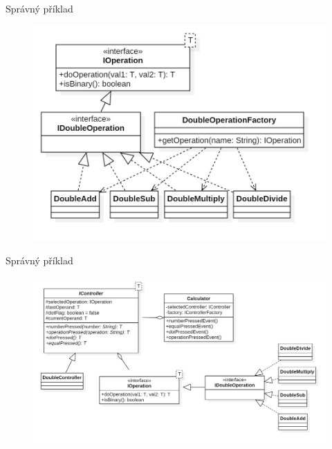 \begin{frame}
	\vfill
	\begin{block}{Správný příklad}
		\begin{figure}[!ht]
			\begin{center}
				\includegraphics[scale=0.27]{obr/goodmodel2.jpg}
			\end{center}
		\end{figure}
	\end{block}
\end{frame}
\begin{frame}
	\vfill
	\begin{block}{Správný příklad}
		\begin{figure}[!ht]
			\begin{center}
				\includegraphics[scale=0.19]{obr/goodmodel3.jpg}
			\end{center}
		\end{figure}
	\end{block}
\end{frame}
